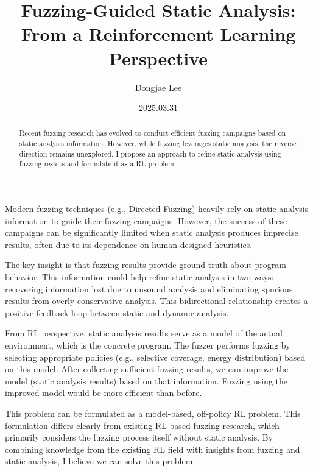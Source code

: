 \documentclass[11pt, oneside]{article}
\title{Fuzzing-Guided Static Analysis: From a Reinforcement Learning Perspective}
\author{Dongjae Lee}
\date{2025.03.31}
\begin{document}
\maketitle

\begin{abstract}
	Recent fuzzing research has evolved to conduct efficient fuzzing campaigns based on static analysis information. However, while fuzzing leverages static analysis, the reverse direction remains unexplored. I propose an approach to refine static analysis using fuzzing results and formulate it as a RL problem.
\end{abstract}

Modern fuzzing techniques (e.g., Directed Fuzzing) heavily rely on static analysis information to guide their fuzzing campaigns. However, the success of these campaigns can be significantly limited when static analysis produces imprecise results, often due to its dependence on human-designed heuristics.

The key insight is that fuzzing results provide ground truth about program behavior. This information could help refine static analysis in two ways: recovering information lost due to unsound analysis and eliminating spurious results from overly conservative analysis. This bidirectional relationship creates a positive feedback loop between static and dynamic analysis.

From RL perspective, static analysis results serve as a model of the actual environment, which is the concrete program. The fuzzer performs fuzzing by selecting appropriate policies (e.g., selective coverage, energy distribution) based on this model. After collecting sufficient fuzzing results, we can improve the model (static analysis results) based on that information. Fuzzing using the improved model would be more efficient than before.

This problem can be formulated as a model-based, off-policy RL problem. This formulation differs clearly from existing RL-based fuzzing research, which primarily considers the fuzzing process itself without static analysis. By combining knowledge from the existing RL field with insights from fuzzing and static analysis, I believe we can solve this problem.
\end{document}
